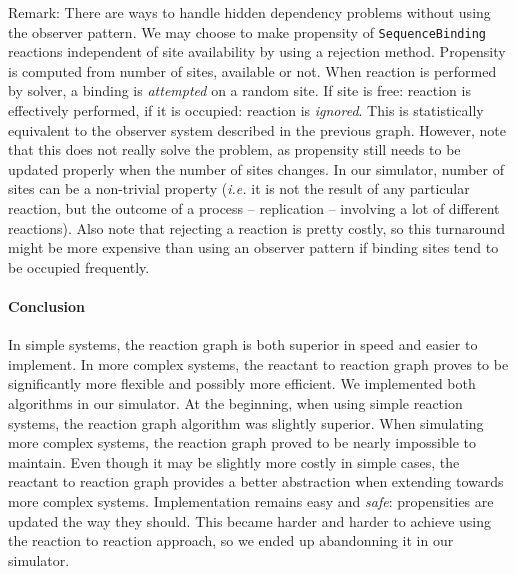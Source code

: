 \begin{footnotesize}
  Remark: There are ways to handle hidden dependency problems without using the observer pattern. We may choose to make propensity of \texttt{SequenceBinding} reactions independent of site availability by using a rejection method. Propensity is computed from number of sites, available or not. When reaction is performed by solver, a binding is \emph{attempted} on a random site. If site is free: reaction is effectively performed, if it is occupied: reaction is \emph{ignored}. This is statistically equivalent to the observer system described in the previous graph. However, note that this does not really solve the problem, as propensity still needs to be updated properly when the number of sites changes. In our simulator, number of sites can be a non-trivial property (\textit{i.e.} it is not the result of any particular reaction, but the outcome of a process -- replication -- involving a lot of different reactions). Also note that rejecting a reaction is pretty costly, so this turnaround might be more expensive than using an observer pattern if binding sites tend to be occupied frequently.
\end{footnotesize}

\paragraph{Conclusion}

In simple systems, the reaction graph is both superior in speed and easier to implement. In more complex systems, the reactant to reaction graph proves to be significantly more flexible and possibly more efficient. We implemented both algorithms in our simulator. At the beginning, when using simple reaction systems, the reaction graph algorithm was slightly superior. When simulating more complex systems, the reaction graph proved to be nearly impossible to maintain. Even though it may be slightly more costly in simple cases, the reactant to reaction graph provides a better abstraction when extending towards more complex systems. Implementation remains easy and \emph{safe}: propensities are updated the way they should. This became harder and harder to achieve using the reaction to reaction approach, so we ended up abandonning it in our simulator.
